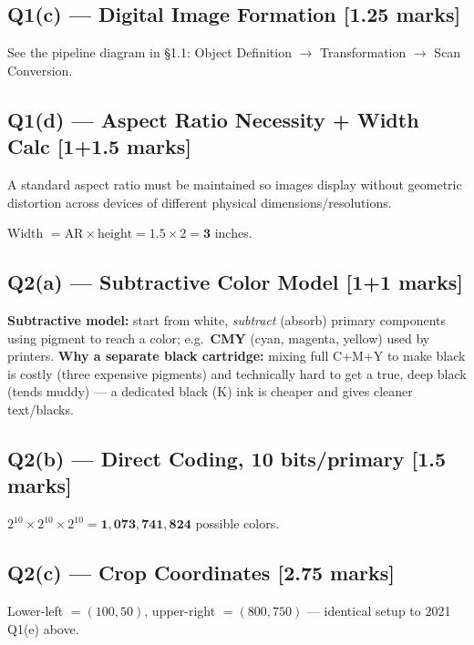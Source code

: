\documentclass[12pt, a4paper]{article}
\newenvironment{answerbox}{\begin{mdframed}[style=answerframe]}{\end{mdframed}}
\begin{document}
\subsection*{Q1(c) --- Digital Image Formation [1.25 marks]}
See the pipeline diagram in \S1.1: Object Definition $\to$ Transformation $\to$ Scan Conversion.

\subsection*{Q1(d) --- Aspect Ratio Necessity + Width Calc [1+1.5 marks]}
A standard aspect ratio must be maintained so images display without geometric distortion across devices of different physical dimensions/resolutions.
\begin{answerbox}
Width $= \text{AR}\times\text{height} = 1.5\times 2 = \mathbf{3}$ inches.
\end{answerbox}

\subsection*{Q2(a) --- Subtractive Color Model [1+1 marks]}
\begin{answerbox}
\textbf{Subtractive model:} start from white, \emph{subtract} (absorb) primary components using pigment to reach a color; e.g.\ \textbf{CMY} (cyan, magenta, yellow) used by printers. \textbf{Why a separate black cartridge:} mixing full C+M+Y to make black is costly (three expensive pigments) and technically hard to get a true, deep black (tends muddy) — a dedicated black (K) ink is cheaper and gives cleaner text/blacks.
\end{answerbox}

\subsection*{Q2(b) --- Direct Coding, 10 bits/primary [1.5 marks]}
\begin{answerbox}
$2^{10}\times 2^{10}\times 2^{10} = \mathbf{1{,}073{,}741{,}824}$ possible colors.
\end{answerbox}

\subsection*{Q2(c) --- Crop Coordinates [2.75 marks]}
\begin{answerbox}
Lower-left $=(100,50)$, upper-right $=(800,750)$ --- identical setup to 2021 Q1(e) above.
\end{answerbox}
\end{document}
